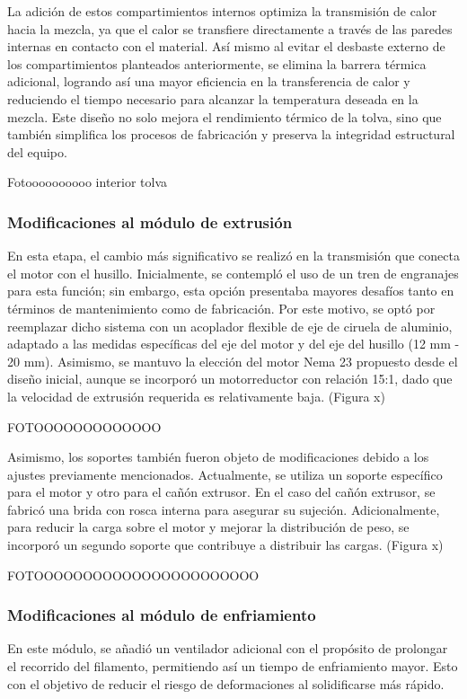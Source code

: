 \documentclass[14pt,oneside]{extarticle} %
\begin{document}
La adición de estos compartimientos internos optimiza la transmisión de calor hacia la mezcla, ya que el calor se transfiere directamente a través de las paredes internas en contacto con el material. Así mismo al evitar el desbaste externo de los compartimientos planteados anteriormente, se elimina la barrera térmica adicional, logrando así una mayor eficiencia en la transferencia de calor y reduciendo el tiempo necesario para alcanzar la temperatura deseada en la mezcla. Este diseño no solo mejora el rendimiento térmico de la tolva, sino que también simplifica los procesos de fabricación y preserva la integridad estructural del equipo.

Fotoooooooooo interior tolva

\subsubsection{Modificaciones al módulo de extrusión}
En esta etapa, el cambio más significativo se realizó en la transmisión que conecta el motor con el husillo. Inicialmente, se contempló el uso de un tren de engranajes para esta función; sin embargo, esta opción presentaba mayores desafíos tanto en términos de mantenimiento como de fabricación. Por este motivo, se optó por reemplazar dicho sistema con un acoplador flexible de eje de ciruela de aluminio, adaptado a las medidas específicas del eje del motor y del eje del husillo (12 mm - 20 mm). Asimismo, se mantuvo la elección del motor Nema 23 propuesto desde el diseño inicial, aunque se incorporó un motorreductor con relación 15:1, dado que la velocidad de extrusión requerida es relativamente baja. (Figura x)

FOTOOOOOOOOOOOOO

Asimismo, los soportes también fueron objeto de modificaciones debido a los ajustes previamente mencionados. Actualmente, se utiliza un soporte específico para el motor y otro para el cañón extrusor. En el caso del cañón extrusor, se fabricó una brida con rosca interna para asegurar su sujeción. Adicionalmente, para reducir la carga sobre el motor y mejorar la distribución de peso, se incorporó un segundo soporte que contribuye a distribuir las cargas. (Figura x)

FOTOOOOOOOOOOOOOOOOOOOOOOO

\subsubsection{Modificaciones al módulo de enfriamiento}
En este módulo, se añadió un ventilador adicional con el propósito de prolongar el recorrido del filamento, permitiendo así un tiempo de enfriamiento mayor. Esto con el objetivo de reducir el riesgo de deformaciones al solidificarse más rápido.
\end{document}
